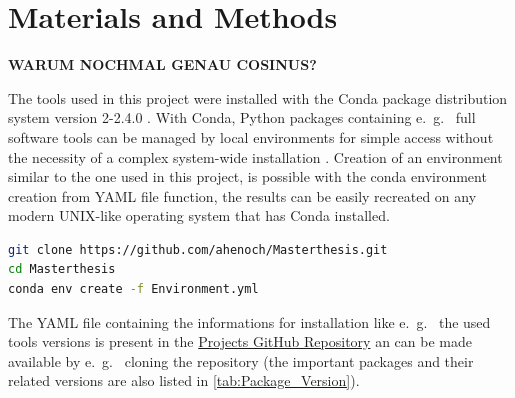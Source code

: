 \chapter{Materials and Methods} \label{chap:Materials_and_Methods}

\textbf{WARUM NOCHMAL GENAU COSINUS?}

The tools used in this project were installed with the Conda package distribution system version 2-2.4.0 \autocite{anaconda_software_distribution_anaconda_2020}. With Conda, Python packages containing e.~g.~ full software tools can be managed by local environments for simple access without the necessity of a complex system-wide installation \autocite{anaconda_software_distribution_anaconda_2020}. Creation of an environment similar to the one used in this project, is possible with the conda environment creation from YAML file function, the results can be easily recreated on any modern UNIX-like operating system that has Conda installed. 

\begin{lstlisting}[language=sh]
git clone https://github.com/ahenoch/Masterthesis.git
cd Masterthesis
conda env create -f Environment.yml
\end{lstlisting}  

The YAML file containing the informations for installation like e.~g.~ the used tools versions is present in the \href{https://github.com/ahenoch/Masterthesis.git}{Projects GitHub Repository} an can be made available by e.~g.~ cloning the repository (the important packages and their related versions are also listed in \autoref{tab:Package_Version}).

\begin{table}[!hbt]
    \centering
    \caption[Package Version]{\textbf{Package Version.} The packages that need to be installed by Conda in a specific version for the pipeline to work as expected are listed in this table. Other related packages necessary for execution of the listed ones are meanwhile installed automatically by Conda.}
    \label{tab:Package_Version}
\end{table}

